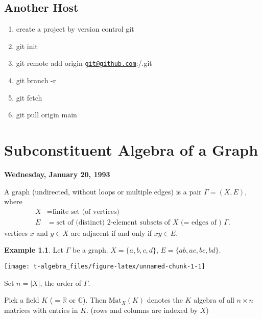 \documentclass[
]{book}
\providecommand{\tightlist}{%
  \setlength{\itemsep}{0pt}\setlength{\parskip}{0pt}}
\theoremstyle{definition}
\theoremstyle{definition}
\newtheorem{example}{Example}[chapter]
\theoremstyle{definition}
\theoremstyle{definition}
\theoremstyle{remark}
\begin{document}
\hypertarget{another-host}{%
\section*{Another Host}\label{another-host}}

\begin{enumerate}
\def\labelenumi{\arabic{enumi}.}
\tightlist
\item
  create a project by version control git
\item
  git init
\item
  git remote add origin \href{mailto:git@github.com}{\nolinkurl{git@github.com}}:/.git
\item
  git branch -r
\item
  git fetch
\item
  git pull origin main
\end{enumerate}

\hypertarget{lec1}{%
\chapter{Subconstituent Algebra of a Graph}\label{lec1}}

\textbf{Wednesday, January 20, 1993}

A graph  (undirected, without loops or multiple edges) is a pair \(\Gamma = (X, E)\), where
\begin{align}
X &= \textrm{finite set (of vertices)}\\
E & = \textrm{set of (distinct) 2-element subsets of }X \textrm{ (= edges of ) }\Gamma.
\end{align}
vertices \(x\) and \(y\in X\) are adjacent if and only if \(xy\in E\).

\begin{example}

Let \(\Gamma\) be a graph. \(X = \{a, b, c, d\}\), \(E = \{ab, ac, bc, bd\}\).

\begin{center}\texttt{[image: t-algebra\_files/figure-latex/unnamed-chunk-1-1]} \end{center}

\end{example}

Set \(n = |X|\), the order of \(\Gamma\).

Pick a field \(K\) (\(=\mathbb{R}\) or \(\mathbb{C}\)). Then \(\mathrm{Mat}_X(K)\) denotes the \(K\) algebra of all \(n\times n\) matrices with entries in \(K\). (rows and columns are indexed by \(X\))
\end{document}
